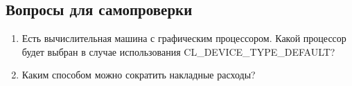 \subsection{Вопросы для самопроверки}
\begin{enumerate}
    \item Есть вычислительная машина с графическим процессором. Какой процессор будет выбран в случае использования CL\_DEVICE\_TYPE\_DEFAULT?
    \item Каким способом можно сократить накладные расходы?
\end{enumerate}
